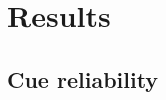 \documentclass{jov}
\begin{document}
\section{Results}

\subsection{Cue reliability}


\end{document}
